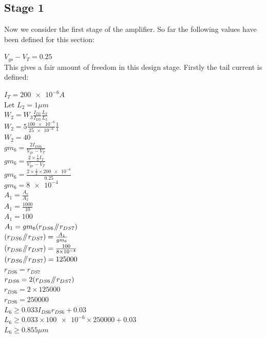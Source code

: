 \subsection{Stage 1}
Now we consider the first stage of the amplifier.
So far the following values have been defined for this section:

$V_{gs} - V_{T} = 0.25$ \\

This gives a fair amount of freedom in this design stage.
Firstly the tail current is defined:

$I_{T} = \num{200e-6}A$ \\

Let $L_{2} = 1\mu m$ \\

$W_{2} = W_{3}\frac{I_{D2}}{I_{D3}}\frac{L_{2}}{L_{3}}$ \\
$W_{2} = 5\frac{\num{100e-6}}{\num{25e-6}}\frac{1}{1}$ \\
$W_{2} = 40$ \\

$gm_{6} = \frac{2I_{DS6}}{V_{gs} - V_{T}}$ \\
$gm_{6} = \frac{2 \times \frac{1}{2}I_{T}}{V_{gs} - V_{T}}$ \\
$gm_{6} = \frac{2 \times \frac{1}{2} \times \num{200e-6}}{0.25}$ \\
$gm_{6} = \num{8e-4}$ \\

$A_{1} = \frac{A_{v}}{A_{2}}$ \\
$A_{1} = \frac{1000}{10}$ \\
$A_{1} = 100$ \\

$A_{1} = gm_{6}(r_{DS6} \mathbin{\!/\mkern-5mu/\!} r_{DS7})$ \\
$(r_{DS6} \mathbin{\!/\mkern-5mu/\!} r_{DS7}) = \frac{A_{1}}{gm_{6}}$ \\
$(r_{DS6} \mathbin{\!/\mkern-5mu/\!} r_{DS7}) = \frac{100}{\num{8e-4}}$ \\
$(r_{DS6} \mathbin{\!/\mkern-5mu/\!} r_{DS7}) = 125000$ \\

$r_{DS6} = r_{DS7}$ \\
$r_{DS6} = 2(r_{DS6} \mathbin{\!/\mkern-5mu/\!} r_{DS7})$ \\
$r_{DS6} = 2 \times 125000$ \\
$r_{DS6} = 250000$ \\

$L_{6} \ge 0.033I_{DS6}r_{DS6} + 0.03$ \\
$L_{6} \ge 0.033 \times \num{100e-6} \times 250000 + 0.03$ \\
$L_{6} \ge 0.855\mu m$ \\

